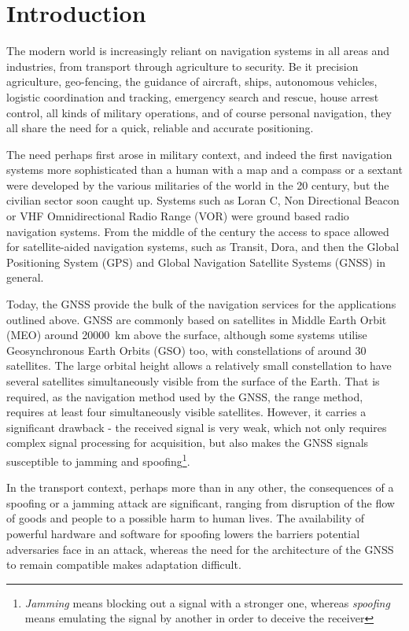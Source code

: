 \chapter{Introduction}
\label{s_int}
The modern world is increasingly reliant on navigation systems in all areas and industries, from transport through agriculture to security. Be it precision agriculture, geo-fencing, the guidance of aircraft, ships, autonomous vehicles, logistic coordination and tracking, emergency search and rescue, house arrest control, all kinds of military operations, and of course personal navigation, they all share the need for a quick, reliable and accurate positioning.

The need perhaps first arose in military context, and indeed the first navigation systems more sophisticated than a human with a map and a compass or a sextant were developed by the various militaries of the world in the 20 century, but the civilian sector soon caught up. Systems such as Loran C, Non Directional Beacon or VHF Omnidirectional Radio Range (VOR) were ground based radio navigation systems. From the middle of the century the access to space allowed for satellite-aided navigation systems, such as Transit, Dora, and then the Global Positioning System (GPS) and Global Navigation Satellite Systems (GNSS) in general.

Today, the GNSS provide the bulk of the navigation services for the applications outlined above. GNSS are commonly based on satellites in Middle Earth Orbit (MEO) around \qty{20000}{km} above the surface, although some systems utilise Geosynchronous Earth Orbits (GSO) too, with constellations of around 30 satellites. The large orbital height allows a relatively small constellation to have several satellites simultaneously visible   from the surface of the Earth. That is required, as the navigation method used by the GNSS, the range method, requires at least four simultaneously visible satellites. However, it carries a significant drawback - the received signal is very weak, which not only requires complex signal processing for acquisition, but also makes the GNSS signals susceptible to jamming and spoofing\footnote{\textit{Jamming} means blocking out a signal with a stronger one, whereas \textit{spoofing} means emulating the signal by another in order to deceive the receiver}.

In the transport context, perhaps more than in any other, the consequences of a spoofing or a jamming attack are significant, ranging from disruption of the flow of goods and people to a possible harm to human lives. The availability of powerful hardware and software for spoofing lowers the barriers potential adversaries face in an attack, whereas the need for the architecture of the GNSS to remain compatible makes adaptation difficult\cite{int01}.

